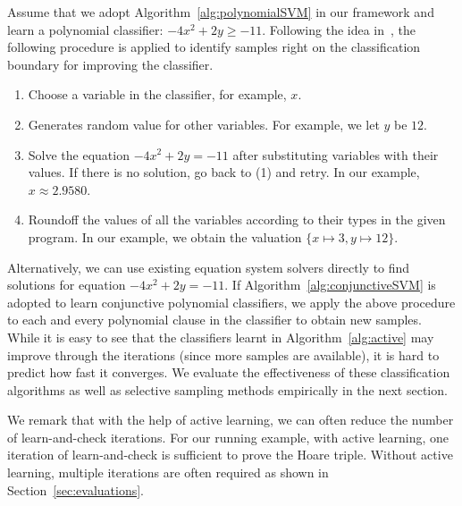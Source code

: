 Assume that we adopt Algorithm~\ref{alg:polynomialSVM} in our framework and learn a polynomial classifier: $\mathit{-4x^2+2y \geq -11}$.
Following the idea in~\cite{DBLP:conf/icml/OrabonaC11}, the following procedure is applied to identify samples right on the classification boundary for improving the classifier.
\begin{enumerate}
\item Choose a variable in the classifier, for example, $x$.
\item Generates random value for other variables. For example, we let $y$ be $12$.
\item Solve the equation $\mathit{-4x^2+2y = -11}$ after substituting variables with their values. If there is no solution, go back to (1) and retry.
In our example, $\mathit{x \approx 2.9580}$.
\item Roundoff the values of all the variables according to their types in the given program. In our example, we obtain the valuation $\mathit{\{x \mapsto 3, y \mapsto 12\}}$.
\end{enumerate}
Alternatively, we can use existing equation system solvers directly to find solutions for equation $\mathit{-4x^2+2y = -11}$.
If Algorithm~\ref{alg:conjunctiveSVM} is adopted to learn conjunctive polynomial classifiers, we apply the above procedure to each and every polynomial clause in the classifier to obtain new samples.
While it is easy to see that the classifiers learnt in Algorithm~\ref{alg:active} may improve through the iterations (since more samples are available),
it is hard to predict how fast it converges.
We evaluate the effectiveness of these classification algorithms as well as selective sampling methods empirically in the next section.

We remark that with the help of active learning, we can often reduce the number of learn-and-check iterations. %
For our running example, with active learning, one iteration of learn-and-check is sufficient to prove the Hoare triple.
Without active learning, multiple iterations are often required as shown in Section~\ref{sec:evaluations}.

